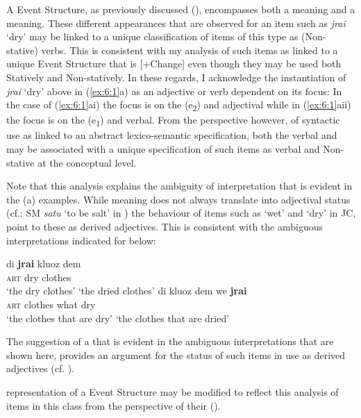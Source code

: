 A  Event Structure, as previously discussed (), encompasses both a  meaning and a  meaning. These different appearances that are observed for an item such as \textit{jrai} `dry' may be linked to a unique classification of items of this type as (Non-stative) verbs. This is consistent with my analysis of such items as linked to a unique Event Structure that is [+Change] even though they may be used both Statively and Non-statively. In these regards, I acknowledge the instantiation of \textit{jrai} `dry' above in (\ref{ex:6:1}a) as an adjective or verb dependent on its focus: In the case of (\ref{ex:6:1}ai) the focus is on the  (e\textsubscript{2}) and adjectival while in (\ref{ex:6:1}aii) the focus is on the  (e\textsubscript{1}) and verbal. From the perspective however, of syntactic use as linked to an abstract lexico-semantic specification, both the verbal and  may be associated with a unique specification of such items as verbal and Non-stative at the conceptual level. 

Note that this analysis explains the ambiguity of interpretation that is evident in the (a) examples. While  meaning does not always translate into adjectival status (cf.: SM \textit{satu} `to be salt' in \citealt{Kouwenberg1996}) the behaviour of items such as `wet' and `dry' in JC, point to these as derived adjectives. This is consistent with the ambiguous interpretations indicated for  below: 

\ea%
\label{ex:6:3}
 \ea
 \gll    di \textbf{jrai} kluoz    dem\\
 \textsc{art}       dry   clothes {\PL}\\
 \ea \glt `the dry clothes' 
 \ex \glt `the dried clothes'
 \z
 \ex
 \gll    di    kluoz    dem we \textbf{jrai}\\
 \textsc{art} clothes {\PL} what        dry \\
 \ea `the clothes that are dry'
 \ex `the clothes that are dried'
 \z
 \z 
\z

The suggestion of a  that is evident in the ambiguous  interpretations that are shown here, provides an argument for the status of such items in  use as derived adjectives (cf. \citealt{Kouwenberg1996}). 

 representation of a  Event Structure may be modified to reflect this analysis of items in this class from the perspective of their  ().

